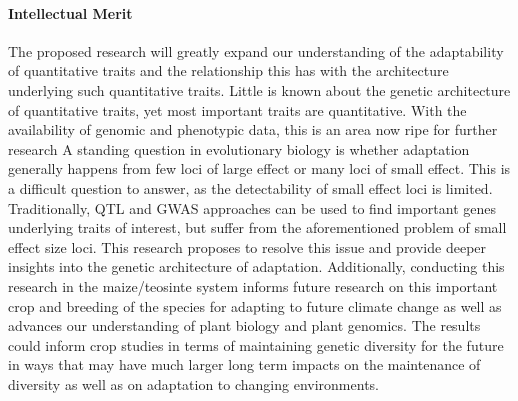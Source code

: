 \paragraph{Intellectual Merit}  



The proposed research will greatly expand our understanding of the adaptability of quantitative traits and the relationship this has with the architecture underlying such quantitative traits. Little is known about the genetic architecture of quantitative traits, yet most important traits are quantitative. With the availability of genomic and phenotypic data, this is an area now ripe for further research %
A standing question in evolutionary biology is whether adaptation generally happens from few loci of large effect or many loci of small effect. This is a difficult question to answer, as the detectability of small effect loci is limited. Traditionally, QTL and GWAS approaches can be used to find important genes underlying traits of interest, but suffer from the aforementioned problem of small effect size loci. This research proposes to resolve this issue and provide deeper insights into the genetic architecture of adaptation. Additionally, conducting this research in the maize\//teosinte system informs future research on this important crop and breeding of the species for adapting to future climate change as well as advances our understanding of plant biology and plant genomics. The results could inform %
crop studies in terms of maintaining genetic diversity for the future in ways that may have much larger long term impacts on the maintenance of diversity as well as on adaptation to changing environments.

